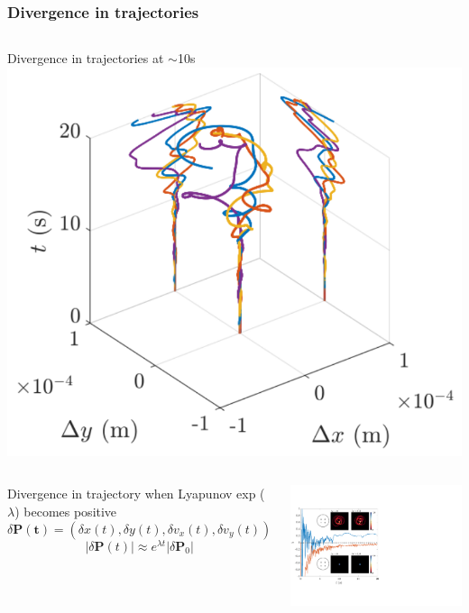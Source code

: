 \documentclass{beamer}
\begin{document}
\begin{frame}
\frametitle{Divergence in trajectories}
\begin{columns}
Divergence in trajectories at $\sim$10s
\includegraphics[width=\textwidth]{../data/2d/evolution/evolution}
\end{columns}

\pause
\begin{columns}

Divergence in trajectory when Lyapunov exp ($\lambda$) becomes positive
$$
\delta \mathbf{P(t)} = (\delta x(t), \delta y(t), \delta v_x(t), \delta v_y(t))
$$
$$
|\delta\mathbf{P}(t)| \approx e^{\lambda t} |\delta \mathbf{P}_0|
$$


\includegraphics[width=\textwidth]{../data/2d/lyap/lyap}
\end{columns}
\end{frame}
\end{document}
